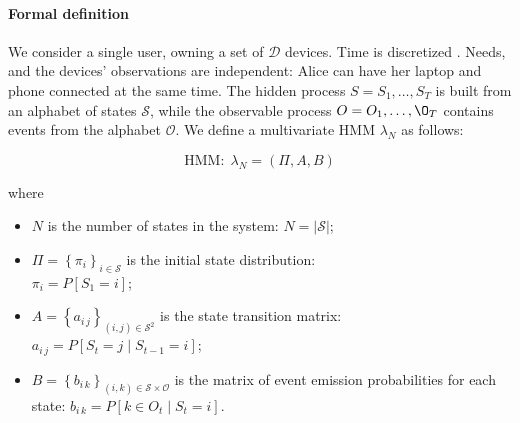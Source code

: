 \paragraph*{Formal definition} 




We consider a single user, owning a set of $\mathcal{D}$ devices.
Time is discretized . Needs, and the devices' observations are independent: Alice can have her laptop and phone connected at the same time.
The hidden process $S=S_1,\dots,S_T$ is built from an alphabet of states $\mathcal{S}$, while the observable process $O=O_1, \dots, \O_T$ contains events from the alphabet $\mathcal{O}$. We define a multivariate HMM $\lambda_N$ as follows:

$$\text{HMM}:\;\lambda_N=(\Pi, A, B)$$

where 
\begin{itemize}
	\item $N$ is the number of states in the system:
	$N = \left| \mathcal{S} \right|$;

	\item $\Pi=\left\{ \pi_i\right\}_{i\in\mathcal{S}}$ is the initial state distribution:\\
	$\pi_i=P[S_1=i]$;

	\item $A = \left\{ a_{i\,j}\right\}_{(i,j)\in\mathcal{S}^2}$ is the state transition matrix:\\
	$a_{i\,j}=P[S_t=j \mid S_{t-1}=i]$;

	\item $B = \left\{ b_{i\,k}\right\}_{(i,k)\in\mathcal{S}\times\mathcal{O}}$ is the matrix of event emission probabilities for each state:
	$b_{i\,k} = P[ k \in O_t \mid S_t = i]$.
\end{itemize}

